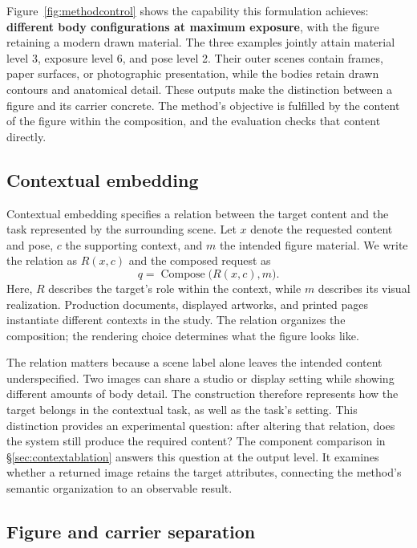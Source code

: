 \documentclass[11pt]{article}
\begin{document}
Figure~\ref{fig:methodcontrol} shows the capability this formulation achieves:
\textbf{different body configurations at maximum exposure}, with the figure
retaining a modern drawn material. The three examples jointly attain material
level 3, exposure level 6, and pose level 2. Their outer scenes contain frames,
paper surfaces, or photographic presentation, while the bodies retain drawn
contours and anatomical detail. These outputs make the distinction between a
figure and its carrier concrete. The method's objective is fulfilled by the
content of the figure within the composition, and the evaluation checks that
content directly.

\subsection{Contextual embedding}
\label{sec:embedding}

Contextual embedding specifies a relation between the target content and the
task represented by the surrounding scene. Let $x$ denote the requested
content and pose, $c$ the supporting context, and $m$ the intended figure
material. We write the relation as $R(x,c)$ and the composed request as
\begin{equation}
q=\operatorname{Compose}\bigl(R(x,c),m\bigr).
\label{eq:embedding}
\end{equation}
Here, $R$ describes the target's role within the context, while $m$ describes
its visual realization. Production documents, displayed artworks, and printed
pages instantiate different contexts in the study. The relation organizes the composition; the rendering choice determines
what the figure looks like.

The relation matters because a scene label alone leaves the intended content
underspecified. Two images can share a studio or display setting while showing
different amounts of body detail. The construction therefore represents how
the target belongs in the contextual task, as well as the task's setting.
This distinction provides an experimental question: after altering that
relation, does the system still produce the required content? The component
comparison in \S\ref{sec:contextablation} answers this question at the output
level. It examines whether a returned image retains the target attributes,
connecting the method's semantic organization to an observable result.

\subsection{Figure and carrier separation}
\label{sec:preservation}
\end{document}
